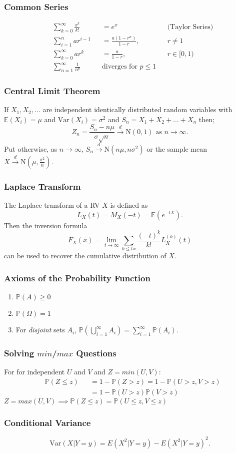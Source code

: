 \documentclass[titlepage,twocolumn]{article}
\begin{document}
\subsubsection*{Common Series}
\begin{align*}
    &\sum_{k=0}^{\infty}\frac{x^k}{k!} &&= e^x &&\mbox{(Taylor Series)} \\
    &\sum_{i=1}^{n} a r^{i-1} &&= \frac{a(1-r^n)}{1-r}, && r \neq 1 \\
    &\sum_{k=0}^{\infty} a r^k &&= \frac{a}{1-r}, && r \in [0,1) \\
    &\sum_{n=1}^{\infty} \frac{1}{n^p} && \mbox{diverges for } p \leq 1
\end{align*}
\subsubsection*{Central Limit Theorem}
If $X_1, X_2,\dots$ are independent identically distributed random variables with $\mathbb{E}(X_i)=\mu$ and $\mbox{Var}(X_i)=\sigma^2$ and $S_n = X_1 + X_2 + \dots + X_n$ then;
$$Z_n = \frac{S_n - n\mu}{\sigma \sqrt{n}} \stackrel{d}{\rightarrow} \mbox{N}(0,1) \mbox{ as } n\rightarrow \infty.$$ Put otherwise, as $n \rightarrow \infty$, $S_n \stackrel{d}{\rightarrow} \mbox{N}(n\mu, n\sigma^2)$ or the sample mean $\overline{X} \stackrel{d}{\rightarrow} \mbox{N}(\mu, \frac{\sigma^2}{n})$.
\subsubsection*{Laplace Transform}
The Laplace transform of a RV $X$ is defined as $$L_X(t)=M_X(-t)=\mathbb{E}(e^{-tX}).$$ Then the inversion formula $$F_X(x) = \lim_{t\rightarrow \infty} \sum_{k\leq tx} \frac{(-t)^k}{k!}L_X^{(k)}(t)$$ can be used to recover the cumulative distribution of $X$.
\subsubsection*{Axioms of the Probability Function}
\begin{enumerate}
    \item $\mathbb{P}(A) \geq 0$
    \item $\mathbb{P}(\Omega) = 1$
    \item For \textit{disjoint} sets $A_i$, $\mathbb{P}(\bigcup_{i=1}^{\infty} A_i) = \sum_{i=1}^{\infty} \mathbb{P}(A_i)$.
\end{enumerate}
\subsubsection*{Solving $min$/$max$ Questions}
For for independent $U$ and $V$ and $Z = min(U, V)$:
\begin{align*}
    &\mathbb{P}(Z \leq z) &&= 1 - \mathbb{P}(Z > z) = 1 - \mathbb{P}(U > z, V > z) \\
    &   &&= 1 - \mathbb{P}(U > z)\mathbb{P}(V > z)
\end{align*}
$Z = max(U, V) \implies \mathbb{P}(Z \leq z) = \mathbb{P}(U \leq z, V \leq z)$
\subsubsection*{Conditional Variance}
$$\mbox{Var}(X|Y=y) = E(X^2|Y=y) - E(X^2|Y=y)^2.$$
\end{document}
